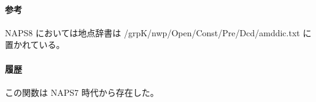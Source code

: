 \paragraph{参考}
NAPS8 においては地点辞書は
/grpK/nwp/Open/Const/Pre/Dcd/amddic.txt に置かれている。
\paragraph{履歴}
この関数は NAPS7 時代から存在した。
